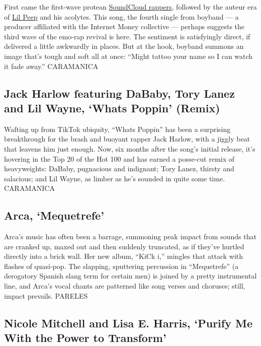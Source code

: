 First came the first-wave protean
\href{https://www.nytimes.com/2017/06/22/arts/music/soundcloud-rap-lil-pump-smokepurrp-xxxtentacion.html}{SoundCloud
rappers}, followed by the auteur era of
\href{https://www.nytimes.com/2018/10/31/arts/music/lil-peep-archives-come-over-when-youre-sober.html}{Lil
Peep} and his acolytes. This song, the fourth single from boyband --- a
producer affiliated with the Internet Money collective --- perhaps
suggests the third wave of the emo-rap revival is here. The sentiment is
satisfyingly direct, if delivered a little awkwardly in places. But at
the hook, boyband summons an image that's tough and soft all at once:
``Might tattoo your name so I can watch it fade away.'' CARAMANICA

\hypertarget{jack-harlow-featuring-dababy-tory-lanez-and-lil-wayne-whats-poppin-remix}{%
\subsection{Jack Harlow featuring DaBaby, Tory Lanez and Lil Wayne,
`Whats Poppin'
(Remix)}\label{jack-harlow-featuring-dababy-tory-lanez-and-lil-wayne-whats-poppin-remix}}

Wafting up from TikTok ubiquity, ``Whats Poppin'' has been a surprising
breakthrough for the brash and buoyant rapper Jack Harlow, with a jiggly
beat that leavens him just enough. Now, six months after the song's
initial release, it's hovering in the Top 20 of the Hot 100 and has
earned a posse-cut remix of heavyweights: DaBaby, pugnacious and
indignant; Tory Lanez, thirsty and salacious; and Lil Wayne, as limber
as he's sounded in quite some time. CARAMANICA

\hypertarget{arca-mequetrefe}{%
\subsection{Arca, `Mequetrefe'}\label{arca-mequetrefe}}

Arca's music has often been a barrage, summoning peak impact from sounds
that are cranked up, maxed out and then suddenly truncated, as if
they've hurtled directly into a brick wall. Her new album, ``KiCk i,''
mingles that attack with flashes of quasi-pop. The slapping, sputtering
percussion in ``Mequetrefe'' (a derogatory Spanish slang term for
certain men) is joined by a pretty instrumental line, and Arca's vocal
chants are patterned like song verses and choruses; still, impact
prevails. PARELES

\hypertarget{nicole-mitchell-and-lisa-e-harris-purify-me-with-the-power-to-transform}{%
\subsection{Nicole Mitchell and Lisa E. Harris, `Purify Me With the
Power to
Transform'}\label{nicole-mitchell-and-lisa-e-harris-purify-me-with-the-power-to-transform}}

